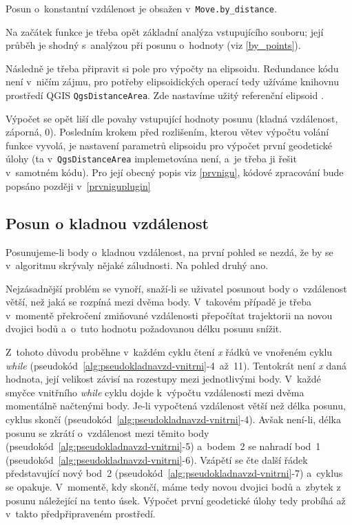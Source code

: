 Posun o~konstantní vzdálenost je obsažen v~{\tt Move.by\_distance}. 

Na začátek funkce je třeba opět základní analýza vstupujícího souboru; její průběh je shodný
s~analýzou při posunu o~hodnoty (viz \ref{by_points}). 

Následně je třeba připravit si pole pro výpočty na elipsoidu. Redundance kódu není v~ničím
zájmu, pro potřeby elipsoidických operací tedy užíváme knihovnu
prostředí QGIS {\tt QgsDistanceArea}. Zde nastavíme
užitý referenční elipsoid . 

Výpočet se opět liší dle povahy vstupující hodnoty posunu (kladná vzdálenost,
záporná, 0). Posledním krokem před rozlišením, kterou větev výpočtu volání funkce vyvolá, je nastavení
parametrů elipsoidu pro výpočet první geodetické úlohy (ta v~{\tt QgsDistanceArea} implemetována
není, a~je třeba ji řešit v~samotném kódu). Pro její obecný popis viz
\ref{prvnigu}, kódové zpracování bude popsáno později v~\ref{prvniguplugin} 

\subsection{Posun o kladnou vzdálenost}
\label{kladnavzdalenost}

Posunujeme-li body o~kladnou vzdálenost, na první pohled se nezdá, že by se v~algoritmu skrývaly
nějaké záludnosti. Na pohled druhý ano. 

Nejzásadnější problém se vynoří, snaží-li se uživatel posunout body o~vzdálenost větší, než
jaká se rozpíná mezi dvěma body. V~takovém případě je třeba v~momentě překročení zmiňované
vzdálenosti přepočítat trajektorii na novou dvojici bodů a~o~tuto hodnotu požadovanou
délku posunu snížit. 

Z~tohoto důvodu proběhne v~každém cyklu čtení \textit{x} řádků ve vnořeném cyklu \textit{while}
(pseudokód~\ref{alg:pseudokladnavzd-vnitrni}-4~až~11).
Tentokrát není \textit{x} daná hodnota, její velikost závisí na rozestupy mezi jednotlivými body.
V~každé smyčce vnitřního \textit{while} cyklu dojde k~výpočtu vzdálenosti mezi dvěma momentálně
načtenými body. Je-li vypočtená vzdálenost větší než délka posunu, cyklus skončí
(pseudokód~\ref{alg:pseudokladnavzd-vnitrni}-4). 
Avšak není-li, délka posunu se zkrátí o~vzdálenost mezi těmito body
(pseudokód~\ref{alg:pseudokladnavzd-vnitrni}-5) a~bodem~2 se nahradí bod~1
(pseudokód~\ref{alg:pseudokladnavzd-vnitrni}-6).
Vzápětí se čte další řádek představující nový bod~2
(pseudokód~\ref{alg:pseudokladnavzd-vnitrni}-7)
a~cyklus se opakuje. V~momentě, kdy
skončí, máme tedy novou dvojici bodů a~zbytek z posunu náležející na tento úsek.
Výpočet první geodetické úlohy tedy probíhá až v~takto předpřipraveném prostředí. 

